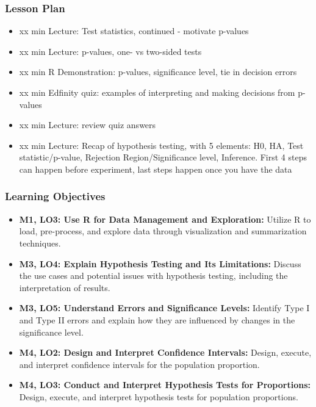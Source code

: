 \begin{frame}
    \frametitle{Lesson Plan}
    \begin{itemize}
        \item xx min Lecture: Test statistics, continued - motivate p-values
        \item xx min Lecture: p-values, one- vs two-sided tests
        \item xx min R Demonstration: p-values, significance level, tie in decision errors
        \item xx min Edfinity quiz: examples of interpreting and making decisions from p-values
        \item xx min Lecture: review quiz answers
        \item xx min Lecture: Recap of hypothesis testing, with 5 elements: H0, HA, Test statistic/p-value, Rejection Region/Significance level, Inference. First 4 steps can happen before experiment, last steps happen once you have the data
    \end{itemize}
\end{frame}
            
\begin{frame}
    \frametitle{Learning Objectives}
    \begin{itemize}
        \item \textbf{M1, LO3: Use R for Data Management and Exploration:} Utilize R to load, pre-process, and explore data through visualization and summarization techniques.
        \item \textbf{M3, LO4: Explain Hypothesis Testing and Its Limitations:} Discuss the use cases and potential issues with hypothesis testing, including the interpretation of results.
        \item \textbf{M3, LO5: Understand Errors and Significance Levels:} Identify Type I and Type II errors and explain how they are influenced by changes in the significance level.
        \item \textbf{M4, LO2: Design and Interpret Confidence Intervals:} Design, execute, and interpret confidence intervals for the population proportion.
        \item \textbf{M4, LO3: Conduct and Interpret Hypothesis Tests for Proportions:} Design, execute, and interpret hypothesis tests for population proportions.
    \end{itemize}
\end{frame}
    
